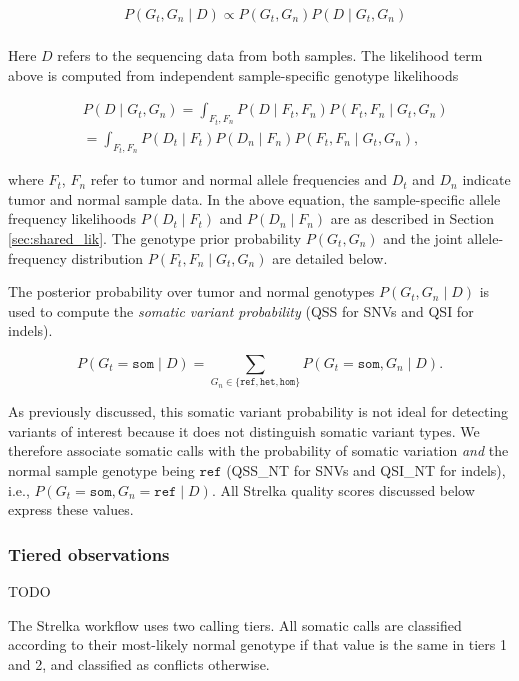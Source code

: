 \documentclass{article}
\begin{document}
\begin{align*}
	& P(G_t,G_n \mid D) \propto P(G_t,G_n) P(D \mid G_t,G_n) \\
\end{align*}


Here $D$ refers to the sequencing data from both samples. The likelihood term above is computed from independent sample-specific genotype likelihoods

\begin{align*}
	& P(D \mid G_t,G_n) = \int_{F_t,F_n}{P(D \mid F_t,F_n)P(F_t,F_n \mid G_t,G_n)} \\
	& = \int_{F_t,F_n}{P(D_t \mid F_t)P(D_n \mid F_n)P(F_t,F_n \mid G_t,G_n)},
\end{align*}

\noindent where $F_t$, $F_n$ refer to tumor and normal allele frequencies and $D_t$ and $D_n$ indicate tumor and normal sample data. In the above equation, the sample-specific allele frequency likelihoods $P(D_t \mid F_t)$ and $P(D_n \mid F_n)$ are as described in Section \ref{sec:shared_lik}. The genotype prior probability $P(G_t, G_n)$ and the joint allele-frequency distribution $P(F_t,F_n \mid G_t,G_n)$ are detailed below.

The posterior probability over tumor and normal genotypes $P(G_t,G_n \mid D)$ is used to compute the {\em somatic variant probability} (QSS for SNVs and QSI for indels).

\begin{equation}
\label{eq:somVarProb}
	P(G_t = \texttt{som} \mid D) = \sum_{G_n \in \{ \texttt{ref}, \texttt{het}, \texttt{hom} \}}{P(G_t=\texttt{som},G_n \mid D)}.
\end{equation}

As previously discussed, this somatic variant probability is not ideal for detecting variants of interest because it does not distinguish somatic variant types. We therefore associate somatic calls with the probability of somatic variation {\em and} the normal sample genotype being $\texttt{ref}$ (QSS\_NT for SNVs and QSI\_NT for indels), i.e., $P(G_t = \texttt{som}, G_n = \texttt{ref} \mid D)$. All Strelka quality scores discussed below express these values.


\subsubsection{Tiered observations}
\label{sec:somatic_tiers}

TODO

The Strelka workflow uses two calling tiers. All somatic calls are classified according to their most-likely normal genotype if that value is the same in tiers 1 and 2, and classified as conflicts otherwise.
\end{document}

